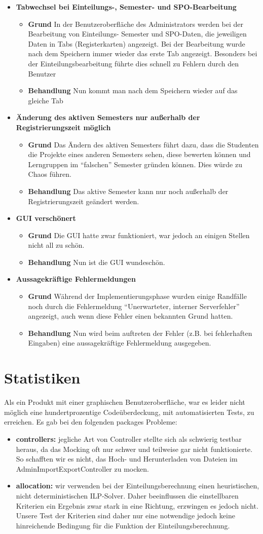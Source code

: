 \documentclass[parskip=full]{scrartcl}
\newcommand{\verbesserung}[3]{\textbf{#1}
 							\begin{itemize}
 							  
 							  \item \textbf{Grund} #2
 							  \item \textbf{Behandlung} #3
 							\end{itemize}}
\newcommand{\code}[1]{{\ttfamily #1}}
\begin{document}
\begin{itemize}
\item \verbesserung{Tabwechsel bei Einteilungs-, Semester- und
SPO-Bearbeitung}{In der Benutzeroberfläche des Administrators werden bei der
Bearbeitung von Einteilungs- Semester und SPO-Daten, die jeweiligen Daten in
Tabs (Registerkarten) angezeigt. Bei der Bearbeitung wurde nach dem Speichern
immer wieder das erste Tab angezeigt. Besonders bei der
Einteilungsbearbeitung führte dies schnell zu Fehlern durch den Benutzer}{Nun
kommt man nach dem Speichern wieder auf das gleiche Tab}
\item \verbesserung{Änderung des aktiven Semesters nur außerhalb der
Registrierungszeit möglich}{Das Ändern des aktiven Semesters führt dazu, dass
die Studenten die Projekte eines anderen Semesters sehen, diese bewerten
können und Lerngruppen im \enquote{falschen} Semester gründen können. Dies
würde zu Chaos führen.}{Das aktive Semester kann nur noch außerhalb der
Registrierungszeit geändert werden.}
\item \verbesserung{GUI verschönert}{Die GUI hatte zwar funktioniert, war
jedoch an einigen Stellen nicht all zu schön.}{Nun ist die GUI wundeschön.}%
\item \verbesserung{Aussagekräftige Fehlermeldungen}{Während der
Implementierungsphase wurden einige Randfälle noch durch die Fehlermeldung
\enquote{Unerwarteter, interner Serverfehler} angezeigt, auch wenn diese
Fehler einen bekannten Grund hatten.}{Nun wird beim auftreten der Fehler (z.B.
bei fehlerhaften Eingaben) eine aussagekräftige Fehlermeldung ausgegeben. }
\end{itemize}
\section{Statistiken}
Als ein Produkt mit einer graphischen Benutzeroberfläche, war es leider nicht
möglich eine hundertprozentige Codeüberdeckung, mit automatisierten Tests, zu
erreichen. Es gab bei den folgenden \code{packages} Probleme:
\begin{itemize}
  \item \textbf{\code{controllers:}} jegliche Art von Controller stellte sich
  als schwierig testbar heraus, da das Mocking oft nur schwer und teilweise gar
  nicht funktionierte. So schafften wir es nicht, das Hoch- und Herunterladen von
  Dateien im \code{AdminImportExportController} zu mocken.
  \item \textbf{\code{allocation:}} wir verwenden bei der Einteilungsberechnung
  einen heuristischen, nicht deterministischen ILP-Solver. Daher beeinflussen
  die einstellbaren Kriterien ein Ergebnis zwar stark in eine Richtung,
  erzwingen es jedoch nicht. Unsere Test der Kriterien sind daher nur eine
  notwendige jedoch keine hinreichende Bedingung für die Funktion der
  Einteilungsberechnung. 
\end{itemize}
\end{document}
